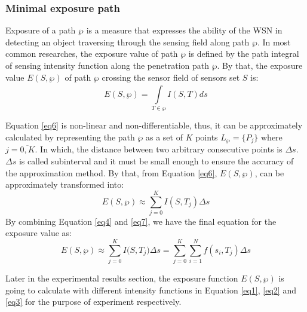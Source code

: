 \documentclass[final]{elsarticle}
\begin{document}
\subsubsection{Minimal exposure path}
Exposure of a path $ \wp $ is a measure that expresses the ability of the WSN in detecting an object traversing through the sensing field along path $ \wp $. In most common researches, the exposure value of path $ \wp $ is defined by the path integral of sensing intensity function along the penetration path $ \wp $. By that, the exposure value $  E(S,\wp ) $ of path $ \wp $ crossing the sensor field of sensors set $ S $ is:
\begin{equation}
\label{eq6}
E(S,\wp ) = \int\limits_{T \in \wp }^{} {I(S, T)} ds
\end{equation}

Equation \eqref{eq6} is non-linear and non-differentiable, thus,
it can be approximately calculated by representing the path $\wp $ as a set
of $ K $ points ${L_\wp } = \{ {P_j}\} $ where $j = \overline {0,K} $. In which, the distance between two arbitrary consecutive points is $\Delta s$. $\Delta s$ is called subinterval and it must be small enough to ensure the accuracy of the approximation method. By that, from Equation \eqref{eq6}, $ E(S,\wp ) $, can be approximately transformed into:
\begin{equation}
\label{eq7}
E(S,\wp) \approx \sum\limits_{j = 0}^K {I(S, T_j)\Delta s} 
\end{equation}
By combining Equation \eqref{eq4} and \eqref{eq7}, we have the final equation for the exposure value as:
\begin{equation}
\label{eq8}
E(S,\wp ) \approx \sum\limits_{j = 0}^K {I(S,{T_j}} )\Delta s = \sum\limits_{j = 0}^K {\sum\limits_{i = 1}^N {f({s_i},{T_j})} } \Delta s
\end{equation}

Later in the experimental results section, the exposure function $ E(S,\wp )$ is going to calculate with different intensity functions in Equation \eqref{eq1}, \eqref{eq2} and \eqref{eq3} for the purpose of experiment respectively. 
\end{document}
